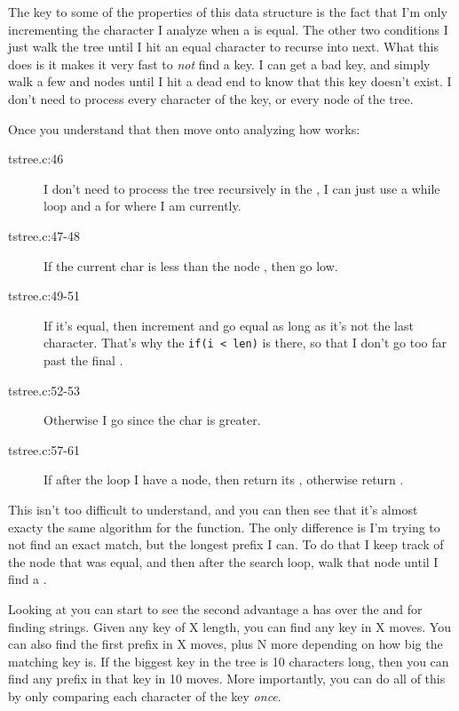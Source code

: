 The key to some of the properties of this data structure is the fact that I'm
only incrementing the character I analyze when a  is equal.
The other two conditions I just walk the tree until I hit an equal character to
recurse into next.  What this does is it makes it very fast to \emph{not}
find a key.  I can get a bad key, and simply walk a few  and 
nodes until I hit a dead end to know that this key doesn't exist.  I don't need
to process every character of the key, or every node of the tree.

Once you understand that then move onto analyzing how 
works:

\begin{description}
\item[tstree.c:46] I don't need to process the tree recursively in the ,
    I can just use a while loop and a  for where I am currently.
\item[tstree.c:47-48] If the current char is less than the node , then go low.
\item[tstree.c:49-51] If it's equal, then increment  and go equal as long as it's
    not the last character.  That's why the \verb|if(i < len)| is there, so that
    I don't go too far past the final .
\item[tstree.c:52-53] Otherwise I go  since the char is greater.
\item[tstree.c:57-61] If after the loop I have a node, then return its ,
    otherwise return .
\end{description}

This isn't too difficult to understand, and you can then see that it's almost
exacty the same algorithm for the  function. 
The only difference is I'm trying to not find an exact match, but the longest
prefix I can.  To do that I keep track of the  node that was equal,
and then after the search loop, walk that node until I find a .

Looking at  you can start to see the second advantage
a  has over the  and  for finding
strings.  Given any key of X length, you can find any key in X moves.  You can
also find the first prefix in X moves, plus N more depending on how big the matching
key is.  If the biggest key in the tree is 10 characters long, then you can find
any prefix in that key in 10 moves.  More importantly, you can do all of this
by only comparing each character of the key \emph{once}.

